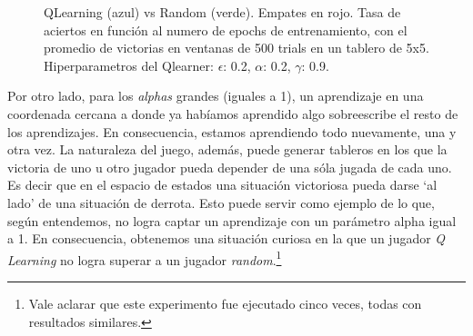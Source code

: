 \documentclass[10pt,a4paper]{article}
\begin{document}
\begin{figure}[H]
\caption{QLearning (azul) vs Random (verde). Empates en rojo. Tasa de aciertos en función al numero de epochs de entrenamiento, con el promedio de victorias en ventanas de 500 trials en un tablero de 5x5. Hiperparametros del Qlearner: $\epsilon$: 0.2, $\alpha$: 0.2, $\gamma$: 0.9.}
\end{figure}

Por otro lado, para los \textit{alphas} grandes (iguales a 1), un aprendizaje en una coordenada cercana a donde ya habíamos aprendido algo sobreescribe el resto de los aprendizajes. En consecuencia, estamos aprendiendo todo nuevamente, una y otra vez. La naturaleza del juego, además, puede generar tableros en los que la victoria de uno u otro jugador pueda depender de una sóla jugada de cada uno. Es decir que en el espacio de estados una situación victoriosa pueda darse `al lado' de una situación de derrota. Esto puede servir como ejemplo de lo que, según entendemos, no logra captar un aprendizaje con un parámetro alpha igual a 1. En consecuencia, obtenemos una situación curiosa en la que un jugador \textit{Q Learning} no logra superar a un jugador \textit{random}.\footnote{Vale aclarar que este experimento fue ejecutado cinco veces, todas con resultados similares.}
\end{document}

